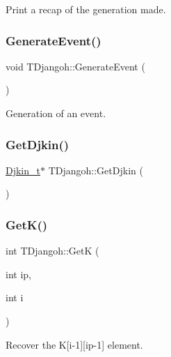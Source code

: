 Print a recap of the generation made. 

\mbox{\label{class_t_djangoh_a121effe35c3f3ac168a4663bcd5eef5c}} 
\subsubsection{\texorpdfstring{Generate\+Event()}{GenerateEvent()}}
{\footnotesize\ttfamily void T\+Djangoh\+::\+Generate\+Event (\begin{DoxyParamCaption}{ }\end{DoxyParamCaption})}



Generation of an event. 

\mbox{\label{class_t_djangoh_a4f5a22f9af97e7c84660c94cd354f780}} 
\subsubsection{\texorpdfstring{Get\+Djkin()}{GetDjkin()}}
{\footnotesize\ttfamily \hyperlink{struct_djkin__t}{Djkin\+\_\+t}$\ast$ T\+Djangoh\+::\+Get\+Djkin (\begin{DoxyParamCaption}{ }\end{DoxyParamCaption})\hspace{0.3cm}{\ttfamily [inline]}}

\mbox{\label{class_t_djangoh_aaf2c94dbb8382bbd3b7ed1530a8ac878}} 
\subsubsection{\texorpdfstring{Get\+K()}{GetK()}}
{\footnotesize\ttfamily int T\+Djangoh\+::\+GetK (\begin{DoxyParamCaption}\item[{int}]{ip,  }\item[{int}]{i }\end{DoxyParamCaption})\hspace{0.3cm}{\ttfamily [inline]}}



Recover the K\mbox{[}i-\/1\mbox{]}\mbox{[}ip-\/1\mbox{]} element. 


